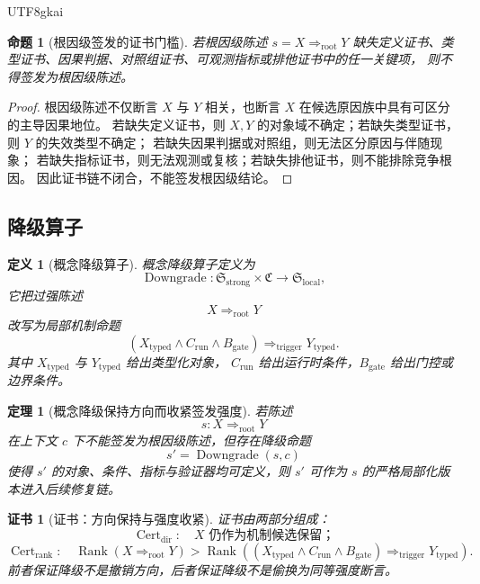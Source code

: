 \documentclass[12pt]{article}
\newtheorem{definition}{定义}[section]
\newtheorem{theorem}{定理}[section]
\newtheorem{proposition}{命题}[section]
\newtheorem{Certificate}{证书}[section]
\newcommand{\Stmt}{\mathfrak S}
\newcommand{\Ctx}{\mathfrak C}
\newcommand{\Cert}{\operatorname{Cert}}
\newcommand{\Downgrade}{\operatorname{Downgrade}}
\newcommand{\Rank}{\operatorname{Rank}}
\begin{document}
\begin{CJK*}{UTF8}{gkai}
\begin{proposition}[根因级签发的证书门槛]
\label{prop:tex52-root-cause-threshold}
若根因级陈述 \(s=X\Rightarrow_{\mathrm{root}}Y\) 缺失定义证书、类型证书、因果判据、对照组证书、可观测指标或排他证书中的任一关键项，
则不得签发为根因级陈述。
\end{proposition}

\begin{proof}
根因级陈述不仅断言 \(X\) 与 \(Y\) 相关，也断言 \(X\) 在候选原因族中具有可区分的主导因果地位。
若缺失定义证书，则 \(X,Y\) 的对象域不确定；若缺失类型证书，则 \(Y\) 的失效类型不确定；
若缺失因果判据或对照组，则无法区分原因与伴随现象；
若缺失指标证书，则无法观测或复核；若缺失排他证书，则不能排除竞争根因。
因此证书链不闭合，不能签发根因级结论。
\end{proof}

\subsection{降级算子}
\label{subsec:tex52-downgrade-operator}

\begin{definition}[概念降级算子]
概念降级算子定义为
\[
  \Downgrade:
  \Stmt_{\mathrm{strong}}\times\Ctx
  \to
  \Stmt_{\mathrm{local}},
\]
它把过强陈述
\[
  X\Rightarrow_{\mathrm{root}}Y
\]
改写为局部机制命题
\[
  (X_{\mathrm{typed}}\wedge C_{\mathrm{run}}\wedge B_{\mathrm{gate}})
  \Rightarrow_{\mathrm{trigger}}
  Y_{\mathrm{typed}}.
\]
其中 \(X_{\mathrm{typed}}\) 与 \(Y_{\mathrm{typed}}\) 给出类型化对象，
\(C_{\mathrm{run}}\) 给出运行时条件，\(B_{\mathrm{gate}}\) 给出门控或边界条件。
\end{definition}

\begin{theorem}[概念降级保持方向而收紧签发强度]
\label{thm:tex52-downgrade-preserves-direction}
若陈述
\[
  s:X\Rightarrow_{\mathrm{root}}Y
\]
在上下文 \(c\) 下不能签发为根因级陈述，但存在降级命题
\[
  s'=\Downgrade(s,c)
\]
使得 \(s'\) 的对象、条件、指标与验证器均可定义，则 \(s'\) 可作为 \(s\) 的严格局部化版本进入后续修复链。
\end{theorem}

\begin{Certificate}[证书：方向保持与强度收紧]
证书由两部分组成：
\[
  \Cert_{\mathrm{dir}}:\quad X \text{ 仍作为机制候选保留；}
\]
\[
  \Cert_{\mathrm{rank}}:\quad
  \Rank(X\Rightarrow_{\mathrm{root}}Y)
  >
  \Rank((X_{\mathrm{typed}}\wedge C_{\mathrm{run}}\wedge B_{\mathrm{gate}})
  \Rightarrow_{\mathrm{trigger}}Y_{\mathrm{typed}}).
\]
前者保证降级不是撤销方向，后者保证降级不是偷换为同等强度断言。
\end{Certificate}


\end{CJK*}
\end{document}

